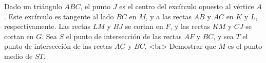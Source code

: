 Dado un triángulo $ABC$, el punto $J$ es el centro del excírculo opuesto al vértice $A$. Este excírculo es tangente al lado $BC$ en $M$, y a las rectas $AB$ y $AC$ en $K$ y $L$, respectivamente. Las rectas $LM$ y $BJ$ se cortan en $F$, y las rectas $KM$ y $CJ$ se cortan en $G$. Sea $S$ el punto de intersección de las rectas $AF$ y $BC$, y sea $T$ el punto de intersección de las rectas $AG$ y $BC$. <br>
Demostrar que $M$ es el punto medio de $ST$.